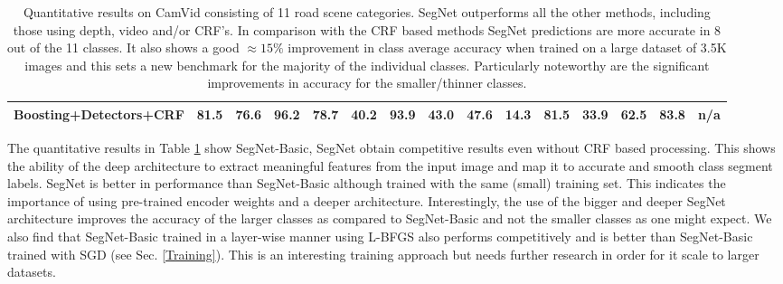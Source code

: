 {\begin{landscape}
\begin{table}[th]
{{\begin{tabular}{c|c|c|c|c|c|c|c|c|c|c|c|ccc}
Boosting+Detectors+CRF \citep{LadickyECCV}   & 81.5     & 76.6 & 96.2 & 78.7 & 40.2        & 93.9 & 43.0       & 47.6  & 14.3        & 81.5     & 33.9      & 62.5       & 83.8    & n/a    \\ \hline
\end{tabular}
}}
\caption[CamVid quantitative results.]{Quantitative results on CamVid \citep{brostow2009semantic} consisting of 11 road scene categories. SegNet outperforms all the other methods, including those using depth, video and/or CRF's. In comparison with the CRF based methods SegNet predictions are more accurate in 8 out of the 11 classes. It also shows a good $\approx 15\%$ improvement in class average accuracy when trained on a large dataset of 3.5K images and this sets a new benchmark for the majority of the individual classes. Particularly noteworthy are the significant improvements in accuracy for the smaller/thinner classes. 
}
\label{CamVidQuant}
\end{table}
\end{landscape}}

The quantitative results in Table \ref{CamVidQuant} show SegNet-Basic, SegNet obtain competitive results even without CRF based processing. This shows the ability of the deep architecture to extract meaningful features from the input image and map it to accurate and smooth class segment labels. SegNet is better in performance than SegNet-Basic although trained with the same (small) training set. This indicates the importance of using pre-trained encoder weights and a deeper architecture. Interestingly, the use of the bigger and deeper SegNet architecture improves the accuracy of the larger classes as compared to SegNet-Basic and not the smaller classes as one might expect. We also find that SegNet-Basic \citep{SegNetarXiv} trained in a layer-wise manner using L-BFGS \citep{Nocedal} also performs competitively and is better than SegNet-Basic trained with SGD (see Sec. \ref{Training}). This is an interesting training approach but needs further research in order for it scale to larger datasets.

